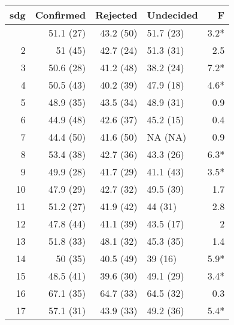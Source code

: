 \begin{table}[t]
\fontsize{12.0pt}{14.4pt}\selectfont
\begin{tabular*}{\linewidth}{@{\extracolsep{\fill}}rrrlr}
\toprule
sdg & Confirmed & Rejected & Undecided & F \\ 
\midrule\addlinespace[2.5pt]
1 & 51.1 (27) & 43.2 (50) & 51.7 (23) & 3.2* \\ 
2 & 51 (45) & 42.7 (24) & 51.3 (31) & 2.5 \\ 
3 & 50.6 (28) & 41.2 (48) & 38.2 (24) & 7.2* \\ 
4 & 50.5 (43) & 40.2 (39) & 47.9 (18) & 4.6* \\ 
5 & 48.9 (35) & 43.5 (34) & 48.9 (31) & 0.9 \\ 
6 & 44.9 (48) & 42.6 (37) & 45.2 (15) & 0.4 \\ 
7 & 44.4 (50) & 41.6 (50) & NA (NA) & 0.9 \\ 
8 & 53.4 (38) & 42.7 (36) & 43.3 (26) & 6.3* \\ 
9 & 49.9 (28) & 41.7 (29) & 41.1 (43) & 3.5* \\ 
10 & 47.9 (29) & 42.7 (32) & 49.5 (39) & 1.7 \\ 
11 & 51.2 (27) & 41.9 (42) & 44 (31) & 2.8 \\ 
12 & 47.8 (44) & 41.1 (39) & 43.5 (17) & 2 \\ 
13 & 51.8 (33) & 48.1 (32) & 45.3 (35) & 1.4 \\ 
14 & 50 (35) & 40.5 (49) & 39 (16) & 5.9* \\ 
15 & 48.5 (41) & 39.6 (30) & 49.1 (29) & 3.4* \\ 
16 & 67.1 (35) & 64.7 (33) & 64.5 (32) & 0.3 \\ 
17 & 57.1 (31) & 43.9 (33) & 49.2 (36) & 5.4* \\ 
\bottomrule
\end{tabular*}
\end{table}

